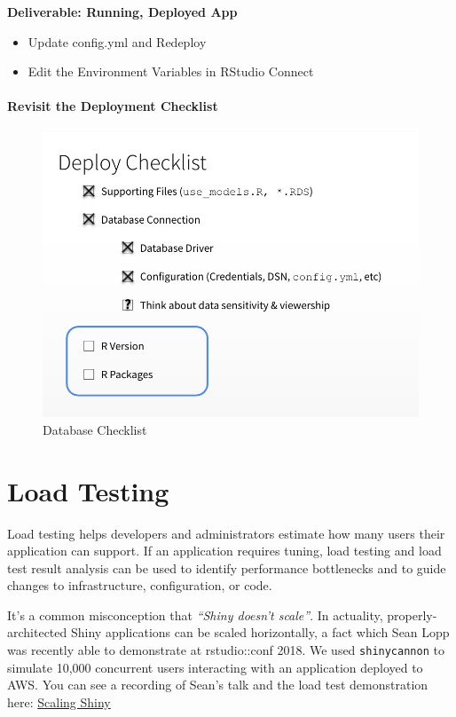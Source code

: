\documentclass[]{book}
\providecommand{\tightlist}{%
  \setlength{\itemsep}{0pt}\setlength{\parskip}{0pt}}
\theoremstyle{definition}
\theoremstyle{definition}
\theoremstyle{definition}
\theoremstyle{remark}
\begin{document}
\textbf{Deliverable: Running, Deployed App}

\begin{itemize}
\tightlist
\item
  Update config.yml and Redeploy
\item
  Edit the Environment Variables in RStudio Connect
\end{itemize}

\hypertarget{revisit-the-deployment-checklist}{%
\subsubsection{Revisit the Deployment
Checklist}\label{revisit-the-deployment-checklist}}

\begin{figure}
\centering
\includegraphics{imgs/databases/database-checklist.png}
\caption{Database Checklist}
\end{figure}

\hypertarget{load-testing}{%
\chapter{Load Testing}\label{load-testing}}

Load testing helps developers and administrators estimate how many users
their application can support. If an application requires tuning, load
testing and load test result analysis can be used to identify
performance bottlenecks and to guide changes to infrastructure,
configuration, or code.

It's a common misconception that \emph{``Shiny doesn't scale''}. In
actuality, properly-architected Shiny applications can be scaled
horizontally, a fact which Sean Lopp was recently able to demonstrate at
rstudio::conf 2018. We used \texttt{shinycannon} to simulate 10,000
concurrent users interacting with an application deployed to AWS. You
can see a recording of Sean's talk and the load test demonstration here:
\href{https://www.rstudio.com/resources/videos/scaling-shiny/}{Scaling
Shiny}
\end{document}

